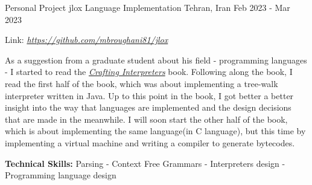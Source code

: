 

\begin{cventries}


  \cventry
  {Personal Project} %
  {jlox Language Implementation} %
  {Tehran, Iran} %
  {Feb 2023 - Mar 2023} %
  {
    \begin{cvitems} %
    \item {Link: \href{https://github.com/mbroughani81/jlox}{\textit{https://github.com/mbroughani81/jlox}}}
    \item {As a suggestion from a graduate student about his field - programming languages - I started to read the \href{https://craftinginterpreters.com/}{\textit{Crafting Interpreters}} book. Following along the book, I read the first half of the book, which was about implementing a tree-walk interpreter written in Java. Up to this point in the book, I got better a better insight into the way that languages are implemented and the design decisions that are made in the meanwhile. I will soon start the other half of the book, which is about implementing the same language(in C language), but this time by implementing a virtual machine and writing a compiler to generate bytecodes.}
    \item {\textbf{Technical Skills:} Parsing - Context Free Grammars - Interpreters design - Programming language design}
    \end{cvitems}
  }


\end{cventries}
